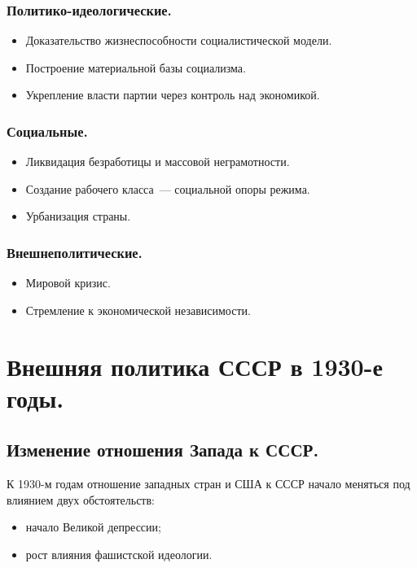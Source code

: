 \documentclass[12pt]{article}
\begin{document}
	\subsubsection{Политико-идеологические.}
	
	\begin{itemize}
		\item Доказательство жизнеспособности социалистической модели.
		\item Построение материальной базы социализма.
		\item Укрепление власти партии через контроль над экономикой.
	\end{itemize}
	
	\subsubsection{Социальные.}
	
	\begin{itemize}
		\item Ликвидация безработицы и массовой неграмотности.
		\item Создание рабочего класса~--- социальной опоры режима.
		\item Урбанизация страны.
	\end{itemize}
	
	\subsubsection{Внешнеполитические.}
	
	\begin{itemize}
		\item Мировой кризис.
		\item Стремление к экономической независимости.
	\end{itemize}
	
		\section{Внешняя политика СССР в 1930-е годы.}

	\subsection{Изменение отношения Запада к СССР.}
	К 1930-м годам отношение западных стран и США к СССР начало меняться под влиянием двух обстоятельств:
	\begin{itemize}
		\item начало Великой депрессии;
		\item рост влияния фашистской идеологии.
	\end{itemize}
\end{document}
